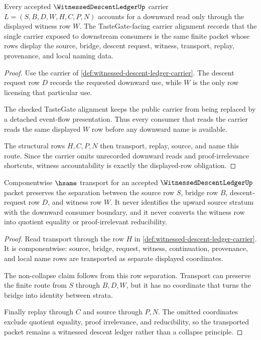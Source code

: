 \begin{theorem}
\label{thm:witnessed-descent-ledger-displayed-witness-accountability}
Every accepted $\WitnessedDescentLedgerUp$ carrier $L=(S,B,D,W,H,C,P,N)$ accounts for a downward read only through the displayed witness row $W$. The TasteGate-facing carrier alignment records that the single carrier exposed to downstream consumers is the same finite packet whose rows display the source, bridge, descent request, witness, transport, replay, provenance, and local naming data.
\end{theorem}
\begin{proof}
Use the carrier of \autoref{def:witnessed-descent-ledger-carrier}. The descent request row $D$ records the requested downward use, while $W$ is the only row licensing that particular use.

The checked TasteGate alignment keeps the public carrier from being replaced by a detached event-flow presentation. Thus every consumer that reads the carrier reads the same displayed $W$ row before any downward name is available.

The structural rows $H,C,P,N$ then transport, replay, source, and name this route. Since the carrier omits unrecorded downward reads and proof-irrelevance shortcuts, witness accountability is exactly the displayed-row obligation.
\end{proof}

\begin{theorem}
\label{thm:witnessed-descent-ledger-noncollapse-transport}
Componentwise $\hsame$ transport for an accepted $\WitnessedDescentLedgerUp$ packet preserves the separation between the source row $S$, bridge row $B$, descent-request row $D$, and witness row $W$. It never identifies the upward source stratum with the downward consumer boundary, and it never converts the witness row into quotient equality or proof-irrelevant reducibility.
\end{theorem}
\begin{proof}
Read transport through the row $H$ in \autoref{def:witnessed-descent-ledger-carrier}. It is componentwise: source, bridge, request, witness, continuation, provenance, and local name rows are transported as separate displayed coordinates.

The non-collapse claim follows from this row separation. Transport can preserve the finite route from $S$ through $B,D,W$, but it has no coordinate that turns the bridge into identity between strata.

Finally replay through $C$ and source through $P,N$. The omitted coordinates exclude quotient equality, proof irrelevance, and reducibility, so the transported packet remains a witnessed descent ledger rather than a collapse principle.
\end{proof}

